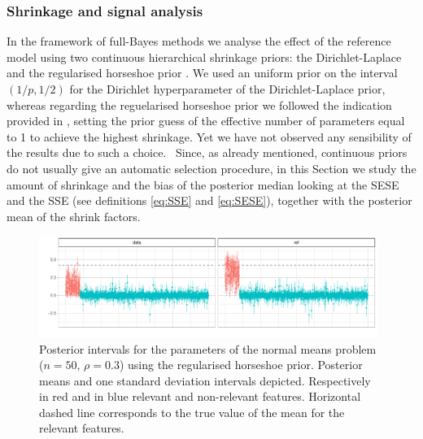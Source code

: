 \documentclass[american,]{article}
\theoremstyle{definition}
\begin{document}
\hypertarget{shrinkage-signal}{%
\subsubsection{Shrinkage and signal analysis}\label{shrinkage-signal}}
In the framework of full-Bayes methods we analyse the effect of the reference model using two continuous hierarchical shrinkage priors: the Dirichlet-Laplace \citep{paper:dirichlet_laplace} and the regularised horseshoe prior \citep{paper:rhs}. 
We used an uniform prior on the interval $(1/p,1/2)$ for the Dirichlet hyperparameter of the Dirichlet-Laplace prior, whereas regarding the reguelarised horseshoe prior we followed the indication provided in \cite{paper:rhs}, setting the prior guess of the effective number of parameters equal to 1 to achieve the highest shrinkage. Yet we have not observed any sensibility of the results due to such a choice.
\
Since, as already mentioned, continuous priors do not usually give an automatic selection procedure, in this Section we study the amount of shrinkage and the bias of the posterior median looking at the SESE and the SSE (see definitions \eqref{eq:SSE} and \eqref{eq:SESE}), together with the posterior mean of the shrink factors. 

\begin{figure}[tp]
  \centering
  \includegraphics[width=0.98\textwidth]{graphics/post_int.pdf}
  \caption{Posterior intervals for the parameters of the normal means problem ($n=50$, $\rho=0.3$) using the regularised horseshoe prior. Posterior means and one standard deviation intervals depicted. Respectively in red and in blue relevant and non-relevant features. Horizontal dashed line corresponds to the true value of the mean for the relevant features.\\}
  \label{fig:posterior_intervals}
\end{figure}
\end{document}
